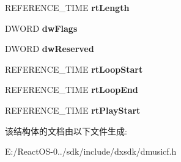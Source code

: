\begin{DoxyCompactItemize}
\item 
\mbox{\label{struct___d_m_u_s___i_o___s_e_g_m_e_n_t___h_e_a_d_e_r_a8465efde68adead1c102bbd744865161}} 
R\+E\+F\+E\+R\+E\+N\+C\+E\+\_\+\+T\+I\+ME {\bfseries rt\+Length}
\item 
\mbox{\label{struct___d_m_u_s___i_o___s_e_g_m_e_n_t___h_e_a_d_e_r_a1c0de6eec1c68589df84dda3d1052b04}} 
D\+W\+O\+RD {\bfseries dw\+Flags}
\item 
\mbox{\label{struct___d_m_u_s___i_o___s_e_g_m_e_n_t___h_e_a_d_e_r_a92a7807406b7fa447dfd53e885ceeffe}} 
D\+W\+O\+RD {\bfseries dw\+Reserved}
\item 
\mbox{\label{struct___d_m_u_s___i_o___s_e_g_m_e_n_t___h_e_a_d_e_r_a94510833722d5a7e9c583a390421f9cf}} 
R\+E\+F\+E\+R\+E\+N\+C\+E\+\_\+\+T\+I\+ME {\bfseries rt\+Loop\+Start}
\item 
\mbox{\label{struct___d_m_u_s___i_o___s_e_g_m_e_n_t___h_e_a_d_e_r_ad0981891156a758c70cbc46739daed94}} 
R\+E\+F\+E\+R\+E\+N\+C\+E\+\_\+\+T\+I\+ME {\bfseries rt\+Loop\+End}
\item 
\mbox{\label{struct___d_m_u_s___i_o___s_e_g_m_e_n_t___h_e_a_d_e_r_a103cf3e5c59ec082e33f200bea6b7599}} 
R\+E\+F\+E\+R\+E\+N\+C\+E\+\_\+\+T\+I\+ME {\bfseries rt\+Play\+Start}
\end{DoxyCompactItemize}


该结构体的文档由以下文件生成\+:\begin{DoxyCompactItemize}
\item 
E\+:/\+React\+O\+S-\/0../sdk/include/dxsdk/dmusicf.\+h\end{DoxyCompactItemize}
